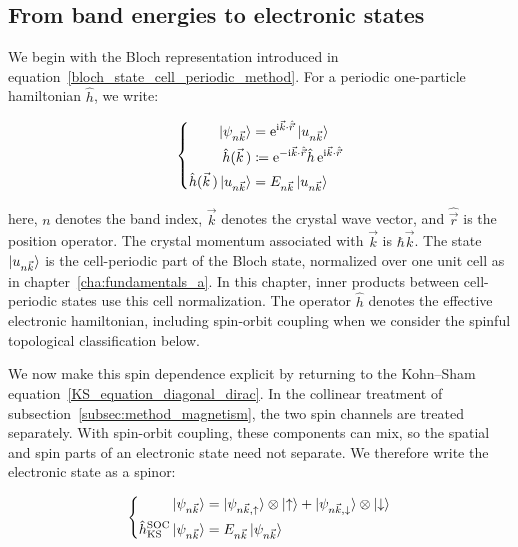 \FloatBarrier
\subsection{From band energies to electronic states}
\label{subsec:method_topology}

We begin with the Bloch representation introduced in equation~\eqref{bloch_state_cell_periodic_method}.
For a periodic one-particle hamiltonian $\hat{h}$, we write:

\begin{equation}
\left\{\begin{aligned}
    \ket{\psi_{n\vec{k}}}
    &=\mathrm{e}^{\mathrm{i}\vec{k}\cdot\hat{\vec{r}}}\ket{u_{n\vec{k}}} \\
    \hat{h}(\vec{k}\,)
    &\coloneqq\mathrm{e}^{-\mathrm{i}\vec{k}\cdot\hat{\vec{r}}}
    \hat{h}\,\mathrm{e}^{\mathrm{i}\vec{k}\cdot\hat{\vec{r}}} \\
    \hat{h}(\vec{k}\,)\ket{u_{n\vec{k}}}
    &=E_{n\vec{k}}\ket{u_{n\vec{k}}}
\end{aligned}\right.
\label{bloch_hamiltonian_topology}
\end{equation}

here, $n$ denotes the band index, $\vec{k}$ denotes the crystal wave vector,
and $\hat{\vec{r}}$ is the position operator.
The crystal momentum associated with $\vec{k}$ is $\hbar\vec{k}$.
The state $\ket{u_{n\vec{k}}}$ is the cell-periodic part of the Bloch state,
normalized over one unit cell as in chapter~\ref{cha:fundamentals_a}.
In this chapter, inner products between cell-periodic states use this cell normalization.
The operator $\hat{h}$ denotes the effective electronic hamiltonian,
including spin-orbit coupling when we consider the spinful topological classification below.

We now make this spin dependence explicit by returning to the Kohn--Sham equation~\eqref{KS_equation_diagonal_dirac}.
In the collinear treatment of subsection~\ref{subsec:method_magnetism}, the two spin channels are treated separately.
With spin-orbit coupling, these components can mix, so the spatial and spin parts of an electronic state need not separate.
We therefore write the electronic state as a spinor:

\begin{equation}
\left\{\begin{aligned}
    \ket{\psi_{n\vec{k}}}
    &=
    \ket{\psi_{n\vec{k},\uparrow}}\otimes\ket{\uparrow}
    +
    \ket{\psi_{n\vec{k},\downarrow}}\otimes\ket{\downarrow} \\
    \hat{h}_\mathrm{KS}^\mathrm{SOC}\ket{\psi_{n\vec{k}}}
    &=E_{n\vec{k}}\ket{\psi_{n\vec{k}}}
\end{aligned}\right.
\label{KS_spinor_equation_method}
\end{equation}

